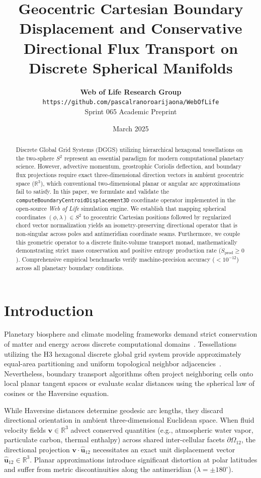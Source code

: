 \documentclass[11pt,a4paper]{article}
\title{\textbf{Geocentric Cartesian Boundary Displacement and Conservative Directional Flux Transport on Discrete Spherical Manifolds}}
\author{
    \textbf{Web of Life Research Group} \\
    \texttt{https://github.com/pascalranoroarijaona/WebOfLife} \\
    Sprint 065 Academic Preprint
}
\date{March 2025}
\theoremstyle{definition}
\begin{document}
\maketitle

\begin{abstract}
Discrete Global Grid Systems (DGGS) utilizing hierarchical hexagonal tessellations on the two-sphere $S^2$ represent an essential paradigm for modern computational planetary science. However, advective momentum, geostrophic Coriolis deflection, and boundary flux projections require exact three-dimensional direction vectors in ambient geocentric space ($\mathbb{R}^3$), which conventional two-dimensional planar or angular arc approximations fail to satisfy. In this paper, we formulate and validate the \texttt{computeBoundaryCentroidDisplacement3D} coordinate operator implemented in the open-source \textit{Web of Life} simulation engine. We establish that mapping spherical coordinates $(\phi, \lambda) \in S^2$ to geocentric Cartesian positions followed by regularized chord vector normalization yields an isometry-preserving directional operator that is non-singular across poles and antimeridian coordinate seams. Furthermore, we couple this geometric operator to a discrete finite-volume transport monad, mathematically demonstrating strict mass conservation and positive entropy production rate ($\dot{S}_{\text{prod}} \ge 0$). Comprehensive empirical benchmarks verify machine-precision accuracy ($< 10^{-12}$) across all planetary boundary conditions.
\end{abstract}

\section{Introduction}

Planetary biosphere and climate modeling frameworks demand strict conservation of matter and energy across discrete computational domains~\cite{sahr2003geodesic}. Tessellations utilizing the H3 hexagonal discrete global grid system provide approximately equal-area partitioning and uniform topological neighbor adjacencies~\cite{uber2018h3}. Nevertheless, boundary transport algorithms often project neighboring cells onto local planar tangent spaces or evaluate scalar distances using the spherical law of cosines or the Haversine equation.

While Haversine distances determine geodesic arc lengths, they discard directional orientation in ambient three-dimensional Euclidean space. When fluid velocity fields $\mathbf{v} \in \mathbb{R}^3$ advect conserved quantities (e.g., atmospheric water vapor, particulate carbon, thermal enthalpy) across shared inter-cellular facets $\partial \Omega_{12}$, the directional projection $\mathbf{v} \cdot \hat{\mathbf{u}}_{12}$ necessitates an exact unit displacement vector $\hat{\mathbf{u}}_{12} \in \mathbb{R}^3$. Planar approximations introduce significant distortion at polar latitudes and suffer from metric discontinuities along the antimeridian ($\lambda = \pm 180^\circ$).
\end{document}
